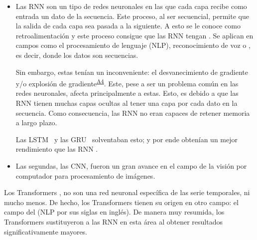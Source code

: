 \begin{itemize}
    \item Las RNN son un tipo de redes neuronales en las que cada capa recibe como entrada un dato de la secuencia. Este proceso, al ser secuencial, permite que la salida de cada capa sea pasada a la siguiente. A esto se le conoce como retroalimentación y este proceso consigue que las RNN tengan . Se aplican en campos como el procesamiento de lenguaje (NLP), reconocimiento de voz o , es decir, donde los datos son secuencias. 
    
    Sin embargo, estas tenían un inconveniente: el desvanecimiento de gradiente y/o explosión de  gradiente\textsuperscript{\hyperref[ap:grad]{A4}}. Este, pese a ser un problema común en las redes neuronales, afecta principalmente a estas. Esto, es debido a que las RNN tienen muchas capas ocultas al tener una capa por cada dato en la secuencia. Como consecuencia, las RNN no eran capaces de retener memoria a largo plazo.
    
    Las LSTM\fnm\ \parencite{lstm} y las GRU\fnm\ \parencite{gru} solventaban esto; y por ende obtenían un mejor rendimiento que las RNN \parencite{rnnvslstmgru}.
    
    \item Las segundas, las CNN,  fueron  un gran avance en el campo de la visión por computador para procesamiento de imágenes. 
\end{itemize} 
\addtocounter{footnote}{1}
\addtocounter{footnote}{1}


Los Transformers \parencite{transformers}, no son una red neuronal específica de las serie temporales, ni mucho menos. De hecho, los Transformers tienen su origen en otro campo: el campo del  (NLP por sus siglas en inglés). De manera muy resumida, los Transformers sustituyeron a las RNN en esta área al obtener resultados significativamente mayores\fnm.
       
